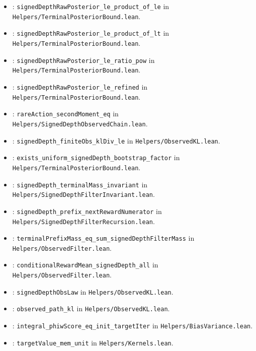 \begin{itemize}
\item {}: \texttt{signedDepthRawPosterior\_le\_product\_of\_le} in \texttt{Helpers/TerminalPosteriorBound.lean}.
\item {}: \texttt{signedDepthRawPosterior\_le\_product\_of\_lt} in \texttt{Helpers/TerminalPosteriorBound.lean}.
\item {}: \texttt{signedDepthRawPosterior\_le\_ratio\_pow} in \texttt{Helpers/TerminalPosteriorBound.lean}.
\item {}: \texttt{signedDepthRawPosterior\_le\_refined} in \texttt{Helpers/TerminalPosteriorBound.lean}.
\item {}: \texttt{rareAction\_secondMoment\_eq} in \texttt{Helpers/SignedDepthObservedChain.lean}.
\item {}: \texttt{signedDepth\_finiteObs\_klDiv\_le} in \texttt{Helpers/ObservedKL.lean}.
\item {}: \texttt{exists\_uniform\_signedDepth\_bootstrap\_factor} in \texttt{Helpers/TerminalPosteriorBound.lean}.
\item {}: \texttt{signedDepth\_terminalMass\_invariant} in \texttt{Helpers/SignedDepthFilterInvariant.lean}.
\item {}: \texttt{signedDepth\_prefix\_nextRewardNumerator} in \texttt{Helpers/SignedDepthFilterRecursion.lean}.
\item {}: \texttt{terminalPrefixMass\_eq\_sum\_signedDepthFilterMass} in \texttt{Helpers/ObservedFilter.lean}.
\item {}: \texttt{conditionalRewardMean\_signedDepth\_all} in \texttt{Helpers/ObservedFilter.lean}.
\item {}: \texttt{signedDepthObsLaw} in \texttt{Helpers/ObservedKL.lean}.
\item {}: \texttt{observed\_path\_kl} in \texttt{Helpers/ObservedKL.lean}.
\item {}: \texttt{integral\_phiwScore\_eq\_init\_targetIter} in \texttt{Helpers/BiasVariance.lean}.
\item {}: \texttt{targetValue\_mem\_unit} in \texttt{Helpers/Kernels.lean}.

\end{itemize}
